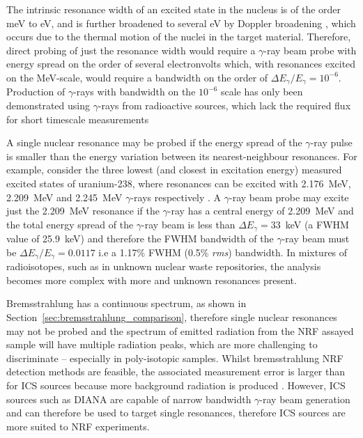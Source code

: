 \documentclass[../main.tex]{subfiles}
\begin{document}
The intrinsic resonance width of an excited state in the nucleus is of the order \si{\milli\electronvolt} to \si{\electronvolt}, and is further broadened to several \si{\electronvolt} by Doppler broadening \cite{angell2015demonstration}, which occurs due to the thermal motion of the nuclei in the target material. Therefore, direct probing of just the resonance width would require a $\gamma$-ray beam probe with energy spread on the order of several electronvolts which, with resonances excited on the \si{\mega\electronvolt}-scale, would require a bandwidth on the order of $\Delta E_{\gamma}/E_{\gamma} = 10^{-6}$. Production of $\gamma$-rays with bandwidth on the $10^{-6}$ scale has only been demonstrated using $\gamma$-rays from radioactive sources, which lack the required flux for short timescale measurements

A single nuclear resonance may be probed if the energy spread of the $\gamma$-ray pulse is smaller than the energy variation between its nearest-neighbour resonances. For example, consider the three lowest (and closest in excitation energy) measured excited states of uranium-238, where resonances can be excited with 2.176~\si{\mega\electronvolt}, 2.209~\si{\mega\electronvolt} and 2.245~\si{\mega\electronvolt} $\gamma$-rays respectively \cite{quiter2011transmission}. A $\gamma$-ray beam probe may excite just the 2.209~\si{\mega\electronvolt} resonance if the $\gamma$-ray has a central energy of 2.209~\si{\mega\electronvolt} and the total energy spread of the $\gamma$-ray beam is less than $\Delta E_{\gamma} = 33$~\si{\kilo\electronvolt} (a FWHM value of 25.9~\si{\kilo\electronvolt}) and therefore the FWHM bandwidth of the $\gamma$-ray beam must be $\Delta E_{\gamma}/E_{\gamma} = 0.0117$ i.e a 1.17\% FWHM (0.5\% \textit{rms}) bandwidth. In mixtures of radioisotopes, such as in unknown nuclear waste repositories, the analysis becomes more complex with more and unknown resonances present. 

Bremsstrahlung has a continuous spectrum, as shown in Section~\ref{sec:bremsstrahlung_comparison}, therefore single nuclear resonances may not be probed and the spectrum of emitted radiation from the NRF assayed sample will have multiple radiation peaks, which are more challenging to discriminate -- especially in poly-isotopic samples. Whilst bremsstrahlung NRF detection methods are feasible, the associated measurement error is larger than for ICS sources because more background radiation is produced \cite{angell2015demonstration}. However, ICS sources such as DIANA are capable of narrow bandwidth $\gamma$-ray beam generation and can therefore be used to target single resonances, therefore ICS sources are more suited to NRF experiments.  
\end{document}
